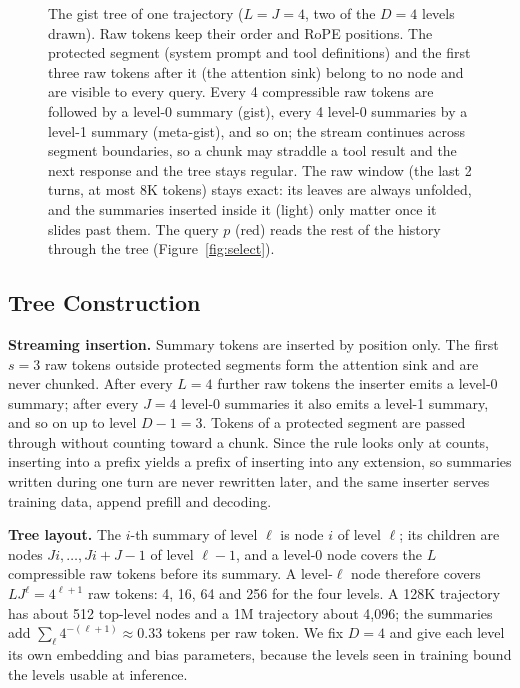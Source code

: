 \documentclass[10pt,twocolumn]{article}
\newcommand{\para}[1]{\noindent\textbf{#1}\hspace{0.5em}}
\begin{document}
\begin{figure}[t]
\caption{The gist tree of one trajectory ($L=J=4$, two of the $D=4$ levels drawn). Raw tokens
keep their order and RoPE positions. The protected segment (system prompt and tool
definitions) and the first three raw tokens after it (the attention sink) belong to no node
and are visible to every query. Every 4 compressible raw tokens are followed by a level-0
summary (gist), every 4 level-0 summaries by a level-1 summary (meta-gist), and so on; the
stream continues across segment boundaries, so a chunk may straddle a tool result and the
next response and the tree stays regular. The raw window (the last 2 turns, at most 8K
tokens) stays exact: its leaves are always unfolded, and the summaries inserted inside it
(light) only matter once it slides past them. The query $p$ (red) reads the rest of the
history through the tree (Figure~\ref{fig:select}).}
\label{fig:tree}
\end{figure}

\subsection{Tree Construction}
\label{sec:tree}

\para{Streaming insertion.}
Summary tokens are inserted by position only. The first $s=3$ raw tokens outside protected
segments form the attention sink \citep{xiao2024sink} and are never chunked. After every
$L=4$ further raw tokens the inserter emits a level-0 summary; after every $J=4$ level-0
summaries it also emits a level-1 summary, and so on up to level $D-1=3$. Tokens of a
protected segment are passed through without counting toward a chunk. Since the rule looks
only at counts, inserting into a prefix yields a prefix of inserting into any extension, so
summaries written during one turn are never rewritten later, and the same inserter serves
training data, append prefill and decoding.

\para{Tree layout.}
The $i$-th summary of level $\ell$ is node $i$ of level $\ell$; its children are nodes
$Ji,\dots,Ji+J-1$ of level $\ell-1$, and a level-0 node covers the $L$ compressible raw tokens
before its summary. A level-$\ell$ node therefore covers $L J^{\ell}=4^{\ell+1}$ raw tokens:
4, 16, 64 and 256 for the four levels. A 128K trajectory has about 512 top-level nodes and a
1M trajectory about 4,096; the summaries add $\sum_{\ell}4^{-(\ell+1)}\approx 0.33$ tokens per
raw token. We fix $D=4$ and give each level its own embedding and bias parameters, because
the levels seen in training bound the levels usable at inference.
\end{document}
